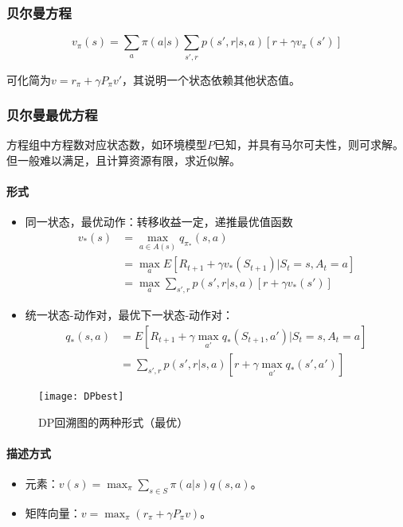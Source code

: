 \documentclass[
12pt, %
a4paper, 
oneside, %
headinclude,footinclude, %
]{scrartcl}
\begin{document}
\subsubsection[贝尔曼方程]{贝尔曼方程}
$$ v_\pi(s) = \sum_a \pi(a|s) \sum_{s', r} p(s', r|s, a) [r + \gamma v_\pi(s')] $$

可化简为$ v = r_\pi + \gamma P_\pi v' $，其说明一个状态依赖其他状态值。
\subsubsection[贝尔曼最优方程]{贝尔曼最优方程}
方程组中方程数对应状态数，如环境模型$ P $已知，并具有马尔可夫性，则可求解。但一般难以满足，且计算资源有限，求近似解。
\paragraph{形式}
\begin{itemize}
\item 同一状态，最优动作：转移收益一定，递推最优值函数
\begin{align*}
v_*(s) 
&= \max_{a \in A(s)} q_{\pi_*}(s, a) \\
&= \max_a E[R_{t + 1} + \gamma v_*(S_{t + 1}) | S_t = s, A_t = a] \\
&= \max_a \sum_{s', r} p(s', r|s, a)[r + \gamma v_*(s')]
\end{align*}
\item 统一状态-动作对，最优下一状态-动作对：
\begin{align*}
q_*(s, a) 
&= E[R_{t + 1} + \gamma \max_{a'} q_*(S_{t + 1}, a') | S_t = s, A_t = a] \\
&= \sum_{s', r} p(s', r|s, a)[r + \gamma \max_{a'} q_*(s', a')]
\end{align*}
\end{itemize}

\begin{figure}[H]
\centering 
\texttt{[image: DPbest]} 
\caption[DP回溯图的两种形式（最优）]{DP回溯图的两种形式（最优）}
\end{figure}
\paragraph{描述方式}
\begin{itemize}
\item 元素：$ v(s) = \max_{\pi} \sum_{s \in S}\pi(a|s)q(s,a) $。
\item 矩阵向量：$ v = \max_{\pi} (r_\pi + \gamma P_\pi v) $。
\end{itemize}
\end{document}
